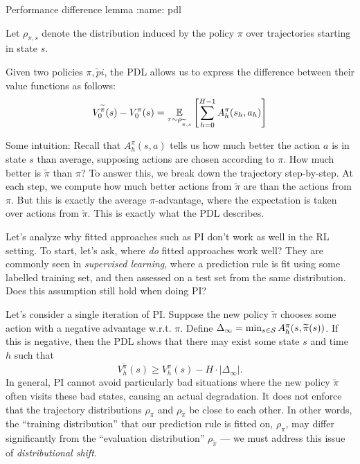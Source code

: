 \documentclass[\main/main]{subfiles}
\begin{document}
\begin{theorem}{Performance difference lemma}
:name: pdl

    Let $\rho_{\pi, s}$ denote the distribution induced by the policy $\pi$ over trajectories starting in state $s$.

    Given two policies $\pi, \tilde pi$, the PDL allows us to express the difference between their value functions as follows:
    \begin{equation}
        V_0^{\tilde \pi}(s) - V_0^\pi(s) = \E_{\tau \sim \rho_{\tilde \pi, s}} \left[ \sum_{h=0}^{H-1} A_h^\pi (s_h, a_h) \right]
    \end{equation}

    Some intuition: Recall that $A^\pi_h(s, a)$ tells us how much better the action $a$ is in state $s$ than average, supposing actions are chosen according to $\pi$.
    How much better is $\tilde \pi$ than $\pi$? To answer this, we break down the trajectory step-by-step. At each step, we compute how much better actions from $\tilde \pi$ are than the actions from $\pi$. But this is exactly the average $\pi$-advantage, where the expectation is taken over actions from $\tilde \pi$. This is exactly what the PDL describes.
\end{theorem}

Let's analyze why fitted approaches such as PI don't work as well in the RL setting.
To start, let's ask, where \emph{do} fitted approaches work well?
They are commonly seen in \emph{supervised learning}, where a prediction rule is fit using some labelled training set, and then assessed on a test set from the same distribution.
Does this assumption still hold when doing PI?

Let's consider a single iteration of PI.
Suppose the new policy $\tilde \pi$ chooses some action with a negative advantage w.r.t. $\pi$.
Define $\Delta_\infty = \min_{s \in \S} A^{\pi}_h(s, \tilde \pi(s))$.
If this is negative, then the PDL shows that there may exist some state $s$ and time $h$ such that
\[
    V_h^{\tilde \pi}(s) \ge V_h^{\pi}(s) - H \cdot |\Delta_\infty|.
\]
In general, PI cannot avoid particularly bad situations where the new policy $\tilde \pi$ often visits these bad states, causing an actual degradation.
It does not enforce that the trajectory distributions $\rho_\pi$ and $\rho_{\tilde \pi}$ be close to each other.
In other words, the ``training distribution'' that our prediction rule is fitted on, $\rho_\pi$, may differ significantly from the ``evaluation distribution'' $\rho_{\tilde \pi}$ --- we must address this issue of \emph{distributional shift}.
\end{document}
